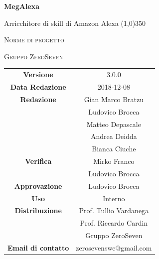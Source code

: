 \documentclass[a4paper,12pt,openany]{book}
\author{Bratzu Gian Marco}
\date{2018-12-08}
\begin{document}
\begin{titlepage}
	\centering
	{\huge\bfseries MegAlexa\par}
	Arricchitore di skill di Amazon Alexa
	\line(1,0){350} \\
	{\scshape\LARGE Norme di progetto \par}
	\vspace{1cm}
	{\scshape Gruppo ZeroSeven \par}
	\logo
	\begin{tabular}{c|c}
		{\hfill \textbf{Versione}} 			& 3.0.0				\\
		{\hfill\textbf{Data Redazione}} 	& 2018-12-08		\\ 
		{\hfill\textbf{Redazione}} 			&  		Gian Marco Bratzu\\&Ludovico Brocca\\&Matteo Depascale\\&Andrea Deidda\\&Bianca Ciuche\\
		{\hfill\textbf{Verifica}} 				&  	Mirko Franco\\& Ludovico Brocca	\\ 
		{\hfill\textbf{Approvazione}} 		&  		Ludovico Brocca			\\ 
		{\hfill\textbf{Uso}} 					& 		Interno		\\ 
		{\hfill\textbf{Distribuzione}} 			& 			Prof. Tullio Vardanega \\ & Prof. Riccardo Cardin \\ & Gruppo ZeroSeven \\
		{\hfill\textbf{Email di contatto}} & zerosevenswe@gmail.com \\
	\end{tabular}
\end{titlepage}
	

	
	\label{LastFrontPage}
	\newpage	
	
	\pagestyle{mymain}
	\tableofcontents
	
	
	
	
	\appendix
			
			
	\label{LastPage}
\end{document}
